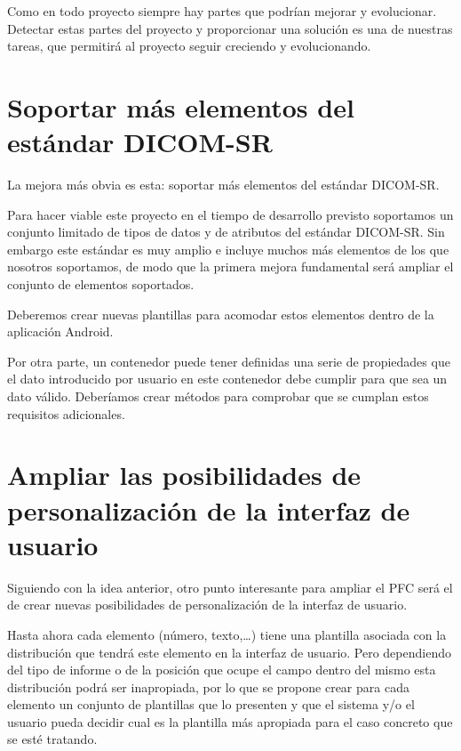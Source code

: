 Como en todo proyecto siempre hay partes que podrían mejorar y evolucionar. Detectar estas partes del proyecto y proporcionar una solución es una de nuestras tareas, que permitirá al proyecto seguir creciendo y evolucionando.\par


\section{Soportar más elementos del estándar DICOM-SR}
La mejora más obvia es esta: soportar más elementos del estándar DICOM-SR. \par
Para hacer viable este proyecto en el tiempo de desarrollo previsto soportamos un conjunto limitado de tipos de datos y de atributos del estándar DICOM-SR. Sin embargo este estándar es muy amplio e incluye muchos más elementos de los que nosotros soportamos, de modo que la primera mejora fundamental será ampliar el conjunto de elementos soportados.\par
Deberemos crear nuevas plantillas para acomodar estos elementos dentro de la aplicación Android.\medskip\par

Por otra parte, un contenedor puede tener definidas una serie de propiedades que el dato introducido por usuario en este contenedor debe cumplir para que sea un dato válido.  Deberíamos crear métodos para comprobar que se cumplan estos requisitos adicionales.\par


\section{Ampliar las posibilidades de personalización de la interfaz de usuario}
Siguiendo con la idea anterior, otro punto interesante para ampliar el PFC será el de crear nuevas posibilidades de personalización de la interfaz de usuario.\medskip\par

Hasta ahora cada elemento (número, texto,\ldots) tiene una plantilla asociada con la distribución que tendrá este elemento en la interfaz de usuario. Pero dependiendo del tipo de informe o de la posición que ocupe el campo dentro del mismo esta distribución podrá ser inapropiada, por lo que se propone crear para cada elemento un conjunto de plantillas que lo presenten y que el sistema y/o el usuario pueda decidir cual es la plantilla más apropiada para el caso concreto que se esté tratando.\medskip\par

